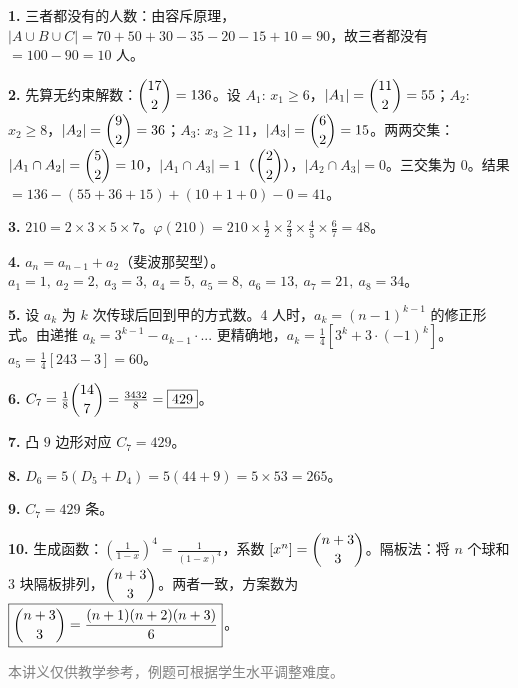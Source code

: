 \documentclass[12pt, a4paper]{ctexart}
\begin{document}
\begin{knowledgebox}[参考答案]
\textbf{1.} 三者都没有的人数：由容斥原理，
\(|A\cup B\cup C| = 70+50+30-35-20-15+10 = 90\)，故三者都没有 \(= 100-90 = \boxed{10}\) 人。

\medskip

\textbf{2.} 先算无约束解数：\(\dbinom{17}{2}=136\)。设 \(A_1\): \(x_1\ge 6\)，\(|A_1|=\dbinom{11}{2}=55\)；\(A_2\): \(x_2\ge 8\)，\(|A_2|=\dbinom{9}{2}=36\)；\(A_3\): \(x_3\ge 11\)，\(|A_3|=\dbinom{6}{2}=15\)。两两交集：\(|A_1\cap A_2|=\dbinom{5}{2}=10\)，\(|A_1\cap A_3|=1\)（\(\dbinom{2}{2}\)），\(|A_2\cap A_3|=0\)。三交集为 \(0\)。结果 \(= 136-(55+36+15)+(10+1+0)-0 = \boxed{41}\)。

\medskip

\textbf{3.} \(210=2\times 3\times 5\times 7\)。\(\varphi(210) = 210\times\frac{1}{2}\times\frac{2}{3}\times\frac{4}{5}\times\frac{6}{7} = \boxed{48}\)。

\medskip

\textbf{4.} \(a_n = a_{n-1}+a_{2}\)（斐波那契型）。\(a_1=1,\ a_2=2,\ a_3=3,\ a_4=5,\ a_5=8,\ a_6=13,\ a_7=21,\ a_8=\boxed{34}\)。

\medskip

\textbf{5.} 设 \(a_k\) 为 \(k\) 次传球后回到甲的方式数。4 人时，\(a_k = (n-1)^{k-1}\) 的修正形式。由递推 \(a_k = 3^{k-1}-a_{k-1}\cdot\)... 更精确地，\(a_k = \frac{1}{4}[3^k+3\cdot(-1)^k]\)。\(a_5 = \frac{1}{4}[243-3] = \boxed{60}\)。

\medskip

\textbf{6.} \(C_7 = \frac{1}{8}\dbinom{14}{7} = \frac{3432}{8} = \boxed{429}\)。

\medskip

\textbf{7.} 凸 \(9\) 边形对应 \(C_7 = \boxed{429}\)。

\medskip

\textbf{8.} \(D_6 = 5(D_5+D_4) = 5(44+9) = 5\times 53 = \boxed{265}\)。

\medskip

\textbf{9.} \(C_7 = \boxed{429}\) 条。

\medskip

\textbf{10.} 生成函数：\(\left(\frac{1}{1-x}\right)^4 = \frac{1}{(1-x)^4}\)，系数 \([x^n] = \dbinom{n+3}{3}\)。隔板法：将 \(n\) 个球和 \(3\) 块隔板排列，\(\dbinom{n+3}{3}\)。两者一致，方案数为 \(\boxed{\dbinom{n+3}{3} = \dfrac{(n+1)(n+2)(n+3)}{6}}\)。
\end{knowledgebox}

\vfill
\begin{center}
\small\textcolor{gray}{本讲义仅供教学参考，例题可根据学生水平调整难度。}
\end{center}
\end{document}
